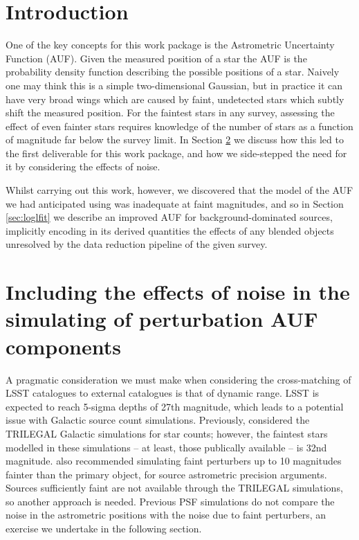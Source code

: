 \documentclass[fleqn,usenatbib]{mnras}
\begin{document}
\section{Introduction}

One of the key concepts for this work package is the Astrometric Uncertainty Function (AUF).
Given the measured position of a star the AUF is the probability density function describing the possible positions of a star.
Naively one may think this is a simple two-dimensional Gaussian, but in practice it can have very broad wings which are caused by faint, undetected stars which subtly shift the measured position.
For the faintest stars in any survey, assessing the effect of even fainter stars requires knowledge of the number of stars as a function of magnitude far below the survey limit.
In Section \ref{sec:noise effects} we discuss how this led to the first deliverable for this work package, and how we side-stepped the need for it by considering the effects of noise.

Whilst carrying out this work, however, we discovered that the model of the AUF we had anticipated using was inadequate at faint magnitudes, and so in Section \ref{sec:loglfit} we describe an improved AUF for background-dominated sources, implicitly encoding in its derived quantities the effects of any blended objects unresolved by the data reduction pipeline of the given survey.

\section{Including the effects of noise in the simulating of perturbation AUF components}
\label{sec:noise effects}
A pragmatic consideration we must make when considering the cross-matching of LSST catalogues to external catalogues is that of dynamic range. LSST is expected to reach 5-sigma depths of 27th magnitude, which leads to a potential issue with Galactic source count simulations. Previously, \citet{2018MNRAS.481.2148W} considered the TRILEGAL \citep{Girardi2005} Galactic simulations for star counts; however, the faintest stars modelled in these simulations -- at least, those publically available -- is 32nd magnitude. \citet{2018MNRAS.481.2148W} also recommended simulating faint perturbers up to 10 magnitudes fainter than the primary object, for source astrometric precision arguments. Sources sufficiently faint are not available through the TRILEGAL simulations, so another approach is needed. 
Previous PSF simulations do not compare the noise in the astrometric positions with the noise due to faint perturbers, an exercise we undertake in the following section.
\end{document}

